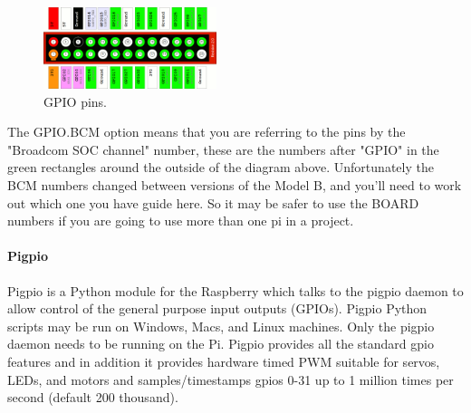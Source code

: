 \documentclass{acm_proc_article-sp}
\begin{document}
\begin{figure}[h]
    \includegraphics[width=0.45\textwidth,natwidth=610,natheight=642]{pictures/ModelAB.png}
    \caption{GPIO pins.\protect\cite{gpioHeader}}
    \label{fig:ModelAB}
\end{figure}

The GPIO.BCM option means that you are referring to the pins by the "Broadcom SOC channel" number, these are the numbers after "GPIO" in the green rectangles around the outside of the diagram above.
\newline
\newline
Unfortunately the BCM numbers changed between versions of the Model B, and you'll need to work out which one you have guide here. So it may be safer to use the BOARD numbers if you are going to use more than one pi in a project.

\paragraph{Pigpio}
Pigpio \cite{Pigpio} is a Python module for the Raspberry which talks to the pigpio daemon to allow control of the general purpose input outputs (GPIOs). Pigpio Python scripts may be run on Windows, Macs, and Linux machines. Only the pigpio daemon needs to be running on the Pi.
\newline
\newline
Pigpio provides all the standard gpio features and in addition it provides hardware timed PWM suitable for servos, LEDs, and motors and samples/timestamps gpios 0-31 up to 1 million times per second (default 200 thousand).
\end{document}
